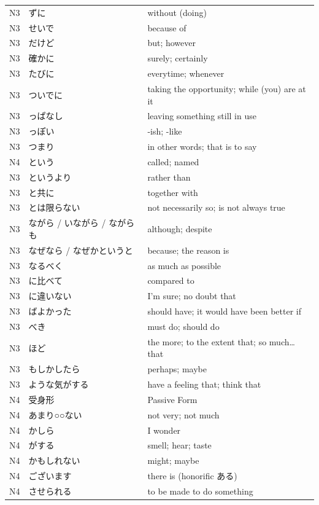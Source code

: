 \begin{longtable}{p{2cm} p{4cm} p{8cm}}
N3	&   ずに  &   	without (doing) \\
N3	&   せいで &   	because of  \\
N3	&   だけど &   	but; however\\
N3	&   確かに &	    surely; certainly\\
N3	&   たびに &   	everytime; whenever\\
N3	&   ついでに   &	taking the opportunity; while (you) are at it\\
N3	&   っぱなし  &	    leaving something still in use\\
N3	&   っぽい &   	    -ish; -like \\
N3	&   つまり &   	    in other words; that is to say\\
N4	&   という &   	    called; named\\
N3	&   というより  &    rather than\\
N3	&   と共に &   	    together with\\
N3	&   とは限らない &	not necessarily so; is not always true\\
N3	&   ながら / いながら / ながらも	&   although; despite \\
N3	&   なぜなら / なぜかというと  &	because; the reason is\\
N3	&   なるべく    &	as much as possible\\
N3	&   に比べて	&       compared to\\
N3	&   に違いない   &	I'm sure; no doubt that\\
N3	&   ばよかった   &	should have; it would have been better if\\
N3	&   べき       &   	must do; should do\\
N3	&   ほど	    &       the more; to the extent that; so much… that\\
N3	&   もしかしたら  &	perhaps; maybe\\
N3	&   ような気がする &	have a feeling that; think that\\
N4	&   受身形 &        Passive Form\\
N4	&   あまり○○ない &	not very; not much\\
N4	&   かしら &       	I wonder\\
N4	&   がする &       	smell; hear; taste\\
N4	&   かもしれない  &	might; maybe\\
N4	&   ございます   &	there is (honorific ある)\\
N4	&   させられる   &	to be made to do something\\

\end{longtable}
